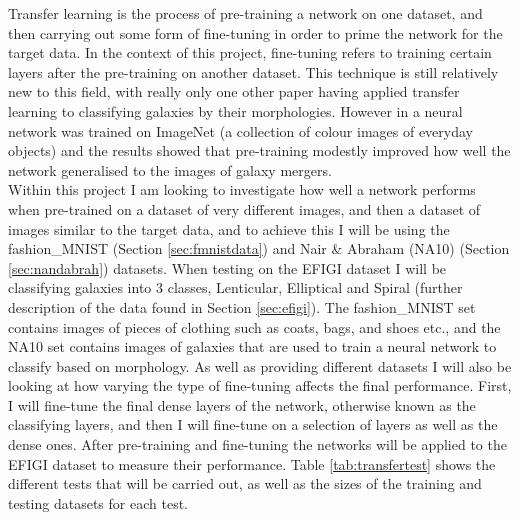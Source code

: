 \documentclass[12pt, onecolumn]{aa}
\begin{document}
Transfer learning is the process of pre-training a network on one dataset, and then carrying out some form of fine-tuning in order to prime the network for the target data. In the context of this project, fine-tuning refers to training certain layers after the pre-training on another dataset. This technique is still relatively new to this field, with really only one other paper \citep{sancheztransfer} having applied transfer learning to classifying galaxies by their morphologies. However in \cite{ackerman2018} a neural network was trained on ImageNet \citep{10026679837} (a collection of colour images of everyday objects) and the results showed that pre-training modestly improved how well the network generalised to the images of galaxy mergers.\\

Within this project I am looking to investigate how well a network performs when pre-trained on a dataset of very different images, and then a dataset of images similar to the target data, and to achieve this I will be using the fashion\_MNIST (Section \ref{sec:fmnistdata}) and Nair \& Abraham (NA10) (Section \ref{sec:nandabrah}) datasets. When testing on the EFIGI dataset I will be classifying galaxies into 3 classes, Lenticular, Elliptical and Spiral (further description of the data found in Section \ref{sec:efigi}). The fashion\_MNIST set contains images of pieces of clothing such as coats, bags, and shoes etc., and the NA10 set contains images of galaxies that are used to train a neural network to classify based on morphology. As well as providing different datasets I will also be looking at how varying the type of fine-tuning affects the final performance. First, I will fine-tune the final dense layers of the network, otherwise known as the classifying layers, and then I will fine-tune on a selection of layers as well as the dense ones. After pre-training and fine-tuning the networks will be applied to the EFIGI dataset to measure their performance. Table \ref{tab:transfertest} shows the different tests that will be carried out, as well as the sizes of the training and testing datasets for each test.\\
\end{document}
